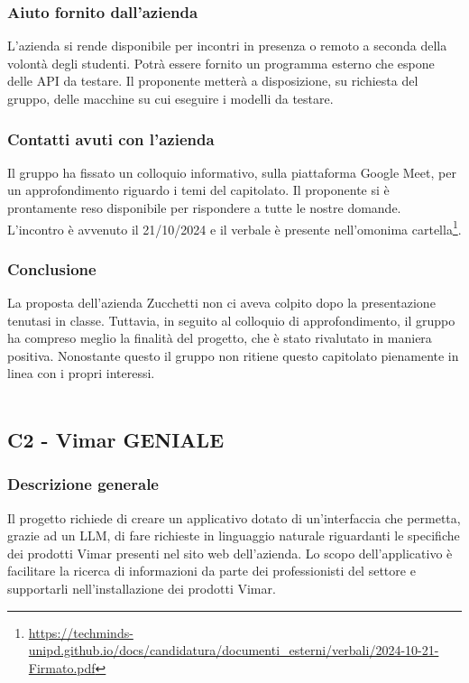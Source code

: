 \documentclass[10pt]{article}
\begin{document}
\subsubsection{Aiuto fornito dall'azienda}
L'azienda si rende disponibile per incontri in presenza o remoto a seconda della volontà degli studenti. Potrà essere fornito un programma esterno che espone delle API da testare. Il proponente metterà a disposizione,  su richiesta del gruppo, delle macchine su cui eseguire i modelli da testare.
\subsubsection{Contatti avuti con l'azienda}
Il gruppo ha fissato un colloquio informativo, sulla piattaforma Google Meet, per un approfondimento riguardo i temi del capitolato. Il proponente si è prontamente reso disponibile per rispondere a tutte le nostre domande. L'incontro è avvenuto il 21/10/2024 e il verbale è presente nell'omonima cartella\footnote{\url{https://techminds-unipd.github.io/docs/candidatura/documenti_esterni/verbali/2024-10-21-Firmato.pdf}}.

\subsubsection{Conclusione}
La proposta dell'azienda Zucchetti non ci aveva colpito dopo la presentazione tenutasi in classe. Tuttavia, in seguito al colloquio di approfondimento, il gruppo ha compreso meglio la finalità del progetto, che è stato rivalutato in maniera positiva. Nonostante questo il gruppo non ritiene questo capitolato pienamente in linea con i propri interessi.
\\\\
\subsection{C2 - Vimar GENIALE}
\subsubsection{Descrizione generale}
Il progetto richiede di creare un applicativo dotato di un’interfaccia che permetta, grazie ad un LLM, di fare richieste in linguaggio naturale riguardanti le specifiche dei prodotti Vimar presenti nel sito web dell’azienda. Lo scopo dell'applicativo è facilitare la ricerca di informazioni da parte dei professionisti del settore e supportarli nell’installazione dei prodotti Vimar.
\end{document}
